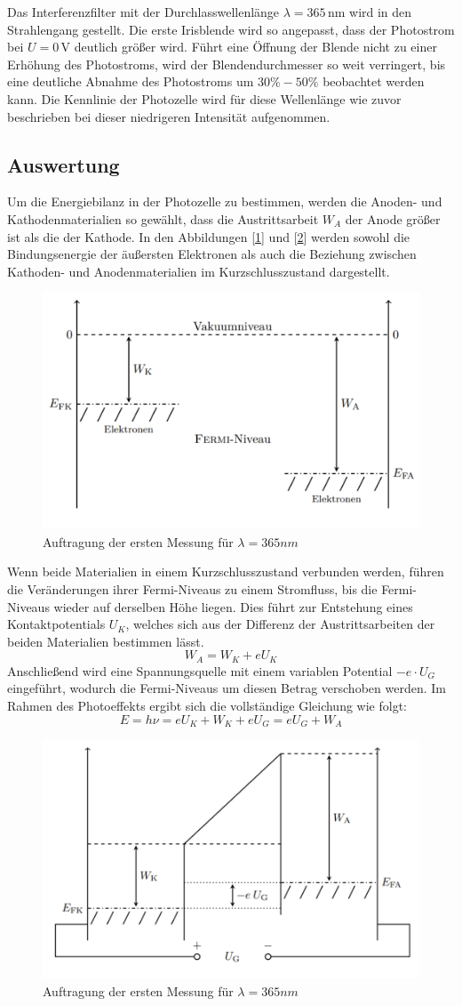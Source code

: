 \documentclass{article}
\begin{document}
Das Interferenzfilter mit der Durchlasswellenlänge $\lambda = 365\,\mathrm{nm}$ wird in den 
Strahlengang gestellt. Die erste Irisblende wird so angepasst, dass der Photostrom bei 
$U = 0\,\mathrm{V}$ deutlich größer wird. Führt eine Öffnung der Blende nicht zu einer 
Erhöhung des Photostroms, wird der Blendendurchmesser so weit verringert, bis eine deutliche 
Abnahme des Photostroms um $30\%-50\%$ beobachtet werden kann. Die Kennlinie der Photozelle 
wird für diese Wellenlänge wie zuvor beschrieben bei dieser niedrigeren Intensität aufgenommen.

\subsection{Auswertung}
Um die Energiebilanz in der Photozelle zu bestimmen, werden die Anoden- und Kathodenmaterialien 
so gewählt, dass die Austrittsarbeit \( W_A \) der Anode größer ist als die der Kathode. 
In den Abbildungen [\ref{fig:fermi}] und [\ref{fig:energie}] werden sowohl die Bindungsenergie 
der äußersten Elektronen als auch die Beziehung zwischen Kathoden- und Anodenmaterialien im 
Kurzschlusszustand dargestellt.
\begin{figure}[h!]
  \centering
  \includegraphics[width=.4\linewidth]{P402_fermi}
  \caption{Auftragung der ersten Messung für $ \lambda =365nm$}
  \label{fig:fermi}
\end{figure}
Wenn beide Materialien in einem Kurzschlusszustand verbunden werden, führen die 
Veränderungen ihrer Fermi-Niveaus zu einem Stromfluss, bis die Fermi-Niveaus wieder 
auf derselben Höhe liegen. Dies führt zur Entstehung eines Kontaktpotentials \( U_K \),
 welches sich aus der Differenz der Austrittsarbeiten der beiden Materialien bestimmen lässt.
\[
W_A = W_K + eU_K
\]
Anschließend wird eine Spannungsquelle mit einem variablen Potential
 \( -e \cdot U_G \) eingeführt, wodurch die Fermi-Niveaus um diesen Betrag verschoben werden.
Im Rahmen des Photoeffekts ergibt sich die vollständige Gleichung wie folgt:
\begin{equation}
  E = h \nu = e U_{K} + W_K + e U_G = e U_G + W_A
\end{equation}
\begin{figure}[h!]
  \centering
  \includegraphics[width=.4\linewidth]{P402_energie}
  \caption{Auftragung der ersten Messung für $ \lambda =365nm$}
  \label{fig:energie}
\end{figure}
\newpage
\end{document}
